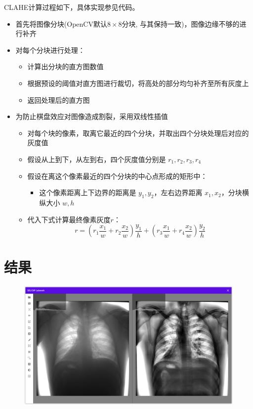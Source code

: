 \documentclass{article}
\begin{document}
CLAHE计算过程如下，具体实现参见代码。

\begin{itemize}
    \item 首先将图像分块(OpenCV默认$8\times 8$分块, 与其保持一致)，图像边缘不够的进行补齐
    \item 对每个分块进行处理：
    \begin{itemize}
        \item 计算出分块的直方图数值
        \item 根据预设的阈值对直方图进行裁切，将高处的部分均匀补齐至所有灰度上
        \item 返回处理后的直方图
    \end{itemize}
    \item 为防止棋盘效应对图像造成割裂，采用双线性插值
    \begin{itemize}
        \item 对每个块的像素，取离它最近的四个分块，并取出四个分块处理后对应的灰度值
        \item 假设从上到下，从左到右，四个灰度值分别是 $r_1, r_2, r_3, r_4$
        \item 假设在离这个像素最近的四个分块的中心点形成的矩形中：
        \begin{itemize}
            \item 这个像素距离上下边界的距离是 $y_1, y_2$，左右边界距离 $x_1, x_2$，分块横纵大小 $w, h$
        \end{itemize}
        \item 代入下式计算最终像素灰度$r$：$$r = (r_1 \frac{x_1}{w} + r_2 \frac{x_2}{w})\frac{y_1}{h} + (r_3 \frac{x_1}{w} + r_4 \frac{x_2}{w})\frac{y_2}{h}$$
    \end{itemize}
\end{itemize}

\section{结果}

\begin{figure}[H]
    \includegraphics[width=\textwidth]{img/lung.png}
\end{figure}
\end{document}
